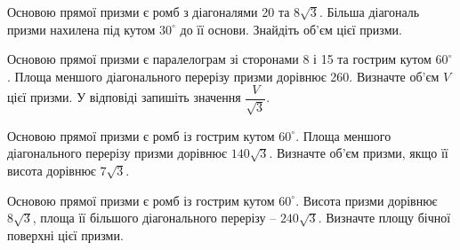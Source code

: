 \documentclass[12pt]{article}
\begin{document}
\begin{samepage}
\par{}
\end{samepage}


\begin{samepage}
\noindent\zadnum Основою прямої призми є ромб з діагоналями 20 та $8\sqrt{3}$. Більша діагональ призми нахилена під кутом $30^\circ$ до її основи. Знайдіть об’єм цієї призми. 

\nmtnobreak
\nopagebreak\nbvspace{0.5cm}
\nmtAnswerBox
\par{}
\end{samepage}

\begin{samepage}
\noindent\zadnum Основою прямої призми є паралелограм зі сторонами 8 і 15 та гострим кутом $60^\circ$. Площа меншого діагонального перерізу призми дорівнює 260. Визначте об’єм $V$ цієї призми. У відповіді запишіть значення $\dfrac{V}{\sqrt{3}}$. 

\nmtnobreak
\nopagebreak\nbvspace{0.5cm}
\nmtAnswerBox
\par{}
\end{samepage}

\begin{samepage}
\noindent\zadnum Основою прямої призми є ромб із гострим кутом $60^\circ$. Площа меншого діагонального перерізу призми дорівнює $140\sqrt{3}$. Визначте об’єм призми, якщо її висота дорівнює $7\sqrt{3}$. 

\nmtnobreak
\nopagebreak\nbvspace{0.5cm}
\nmtAnswerBox
\par{}
\end{samepage}

\begin{samepage}
\noindent\zadnum Основою прямої призми є ромб із гострим кутом $60^\circ$. Висота призми дорівнює $8\sqrt{3}$, площа її більшого діагонального перерізу – $240\sqrt{3}$. Визначте площу бічної поверхні цієї призми. 

\nmtnobreak
\nopagebreak\nbvspace{0.5cm}
\nmtAnswerBox
\par{}
\end{samepage}
\end{document}
